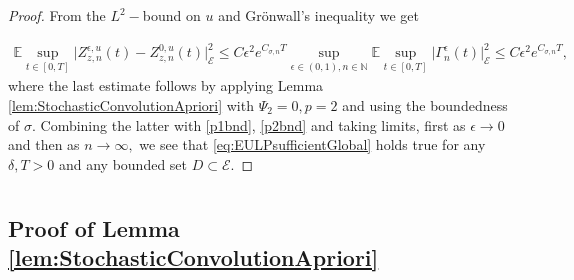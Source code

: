 \documentclass[10pt, reqno]{amsart}
\newcommand{\N}{\mathbb{N}}
\newcommand{\ex}{\mathbb{E}}
\newcommand{\e}{\mathcal{E}}
\theoremstyle{definition}
\numberwithin{lem}{section}
\numberwithin{cor}{section}
\numberwithin{prop}{section}
\numberwithin{thm}{section}
\numberwithin{dfn}{section}
\begin{document}
\begin{proof}
\noindent From the $L^2-$bound on $u$ and Gr\"onwall's inequality we get

\begin{equation*}
\begin{aligned}
\ex\sup_{t\in[0,T]}\big|Z_{z,n}^{\epsilon,u}(t)-Z_{z,n}^{0,u}(t)\big|^2_{\e}\leq C \epsilon^2e^{C_{\sigma, n}T}\sup_{\epsilon\in(0,1), n\in\N}\ex\sup_{t\in[0,T]}\big|\Gamma_n^\epsilon(t)\big|^2_\e\leq C\epsilon^2e^{C_{\sigma, n}T},
\end{aligned}
\end{equation*}
 \noindent where the last estimate follows by applying Lemma \ref{lem:StochasticConvolutionApriori} with $\Psi_2=0, p=2$ and using the boundedness of $\sigma.$  Combining the latter with \eqref{p1bnd}, \eqref{p2bnd} and taking limits, first as $\epsilon\to0 $ and then as $n\to\infty,$ we see that \eqref{eq:EULPsufficientGlobal} holds true for any $\delta, T>0$ and any bounded set $D\subset\e.$ 
\end{proof}














   












    
      
    
    
    




 \appendix
 \section{}\label{section:Appendix}

 
 
 \subsection{Proof of Lemma \ref{lem:StochasticConvolutionApriori}}
 \label{App:StochConv}
 
\end{document}
